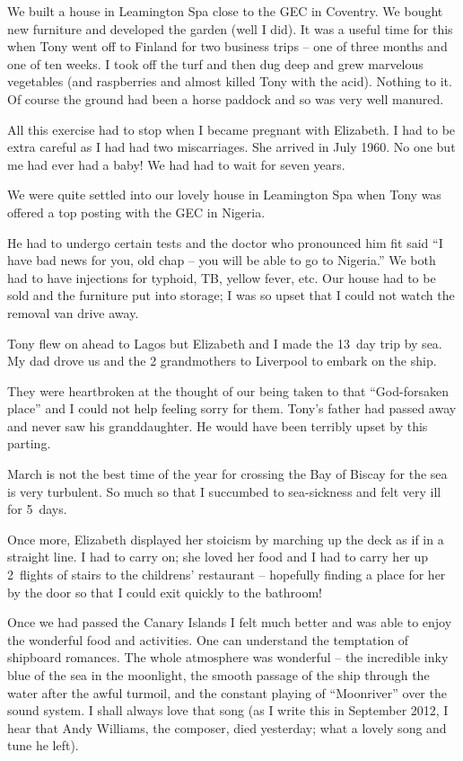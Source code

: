We built a house in Leamington Spa close to the GEC in Coventry. We
bought new furniture and developed the garden (well I did). It was a
useful time for this when Tony went off to Finland for two business
trips -- one of three months and one of ten weeks. I took off the turf
and then dug deep and grew marvelous vegetables (and raspberries and
almost killed Tony with the acid). Nothing to it. Of course the ground
had been a horse paddock and so was very well manured.

All this exercise had to stop when I became pregnant with Elizabeth. I
had to be extra careful as I had had two miscarriages. She arrived in
July 1960. No one but me had ever had a baby! We had had to wait for
seven years.

We were quite settled into our lovely house in Leamington Spa when
Tony was offered a top posting with the GEC in Nigeria.

He had to undergo certain tests and the doctor who pronounced him fit
said ``I have bad news for you, old chap -- you will be able to go to
Nigeria.'' We both had to have injections for typhoid, TB, yellow
fever, etc. Our house had to be sold and the furniture put into
storage; I was so upset that I could not watch the removal van drive
away.

Tony flew on ahead to Lagos but Elizabeth and I made the 13~day trip
by sea. My dad drove us and the 2 grandmothers to Liverpool to embark
on the ship.

They were heartbroken at the thought of our being taken to that
``God-forsaken place'' and I could not help feeling sorry for
them. Tony's father had passed away and never saw his
granddaughter. He would have been terribly upset by this parting.

March is not the best time of the year for crossing the Bay of Biscay
for the sea is very turbulent. So much so that I succumbed to
sea-sickness and felt very ill for 5~days.

Once more, Elizabeth displayed her stoicism by marching up the deck as
if in a straight line. I had to carry on; she loved her food and I had
to carry her up 2~flights of stairs to the childrens' restaurant --
hopefully finding a place for her by the door so that I could exit
quickly to the bathroom!

Once we had passed the Canary Islands I felt much better and was able
to enjoy the wonderful food and activities. One can understand the
temptation of shipboard romances. The whole atmosphere was wonderful
-- the incredible inky blue of the sea in the moonlight, the smooth
passage of the ship through the water after the awful turmoil, and the
constant playing of ``Moonriver'' over the sound system. I shall
always love that song (as I write this in September 2012, I hear that
Andy Williams, the composer, died yesterday; what a lovely song and
tune he left).

